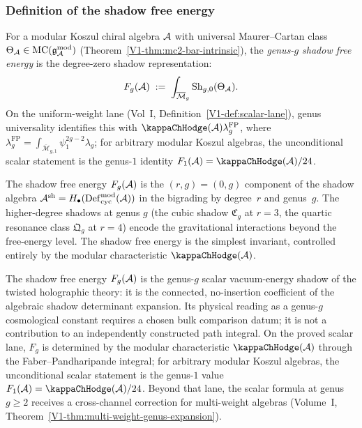 \subsubsection{Definition of the shadow free energy}

\begin{definition}
For a modular Koszul chiral algebra $\mathcal{A}$ with universal Maurer--Cartan class $\Theta_{\mathcal{A}} \in \mathrm{MC}(\mathfrak{g}_{\mathcal{A}}^{\mathrm{mod}})$ (Theorem~\ref*{V1-thm:mc2-bar-intrinsic}), the \emph{genus-$g$ shadow free energy} is the degree-zero shadow representation:
\begin{equation}%
F_g(\cA) \;:=\; \int_{\overline{\mathcal{M}}_g} \operatorname{Sh}_{g,0}(\Theta_\cA).
\end{equation}
On the uniform-weight lane (Vol~I, Definition~\ref*{V1-def:scalar-lane}),
genus universality identifies this
with $\kappaChHodge(\cA)\lambda_g^{\mathrm{FP}}$, where
$\lambda_g^{\mathrm{FP}}
=\int_{\overline{\mathcal{M}}_{g,1}}\psi_1^{2g-2}\lambda_g$; for
arbitrary modular Koszul algebras, the unconditional scalar statement
is the genus-$1$ identity $F_1(\cA)=\kappaChHodge(\cA)/24$.
\end{definition}

\begin{remark}
The shadow free energy $F_g(\mathcal{A})$ is the $(r,g) = (0,g)$ component of the shadow algebra $\mathcal{A}^{\mathrm{sh}} = H_\bullet(\operatorname{Def}_{\mathrm{cyc}}^{\mathrm{mod}}(\mathcal{A}))$ in the bigrading by degree~$r$ and genus~$g$. The higher-degree shadows at genus $g$ (the cubic shadow $\mathfrak{C}_g$ at $r = 3$, the quartic resonance class $\mathfrak{Q}_g$ at $r = 4$) encode the gravitational interactions beyond the free-energy level. The shadow free energy is the simplest invariant, controlled entirely by the modular characteristic $\kappaChHodge(\cA)$.
\end{remark}

\begin{remark}
The shadow free energy $F_g(\mathcal{A})$ is the genus-$g$ scalar
vacuum-energy shadow of the twisted holographic theory: it is the
connected, no-insertion coefficient of the algebraic shadow
determinant expansion. Its physical reading as a genus-$g$
cosmological constant requires a chosen bulk comparison datum; it is
not a contribution to an independently constructed path integral. On the
proved scalar lane, $F_g$ is determined by the modular
characteristic $\kappaChHodge(\cA)$ through the Faber--Pandharipande integral;
for arbitrary modular Koszul algebras, the unconditional scalar
statement is the genus-$1$ value $F_1(\cA)=\kappaChHodge(\cA)/24$. Beyond that
lane, the scalar formula at genus~$g \geq 2$ receives a
cross-channel correction for multi-weight algebras
\textup{(}Volume~I, Theorem~\textup{\ref*{V1-thm:multi-weight-genus-expansion}}\textup{)}.
\end{remark}

